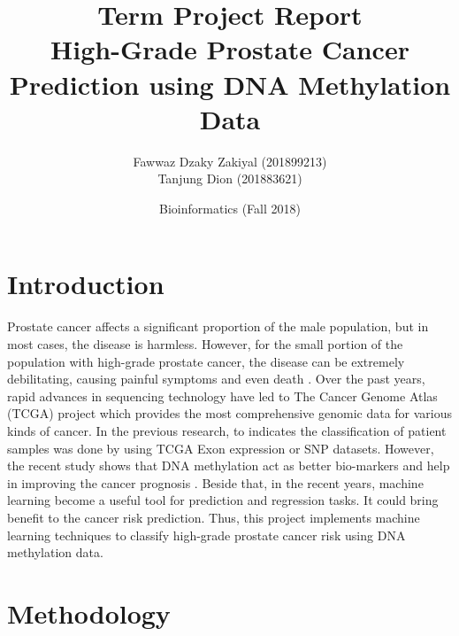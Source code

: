 \documentclass[a4paper,oneside]{article}
\begin{document}
\title{\vspace{-0.7in}Term Project Report\\High-Grade Prostate Cancer Prediction using DNA Methylation Data}
\author{Fawwaz Dzaky Zakiyal (201899213)\\Tanjung Dion (201883621)\\}
\date{Bioinformatics (Fall 2018)}
\maketitle
 
\section{Introduction}
Prostate cancer affects a significant proportion of the male population, but in most cases, the disease is harmless. However, for the small portion of the population with high-grade prostate cancer, the disease can be extremely debilitating, causing painful symptoms and even death \cite{prostate}. Over the past years, rapid advances in sequencing technology have led to The Cancer Genome Atlas (TCGA) project which provides the most comprehensive genomic data for various kinds of cancer. In the previous research, to indicates the classification of patient samples was done by using TCGA Exon expression or SNP datasets. However, the recent study shows that DNA methylation act as better bio-markers and help in improving the cancer prognosis \cite{dnameth}. Beside that, in the recent years, machine learning become a useful tool for prediction and regression tasks. It could bring benefit to the cancer risk prediction. Thus, this project implements machine learning techniques to classify high-grade prostate cancer risk using DNA methylation data.


\section{Methodology}
\end{document}
